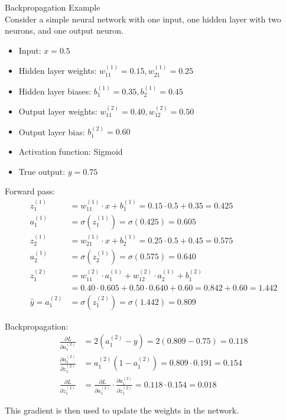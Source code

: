 \begin{example2}{Backpropagation Example}\\
Consider a simple neural network with one input, one hidden layer with two neurons, and one output neuron.
\begin{itemize}
    \item Input: $x = 0.5$
    \item Hidden layer weights: $w^{(1)}_{11} = 0.15, w^{(1)}_{21} = 0.25$
    \item Hidden layer biases: $b^{(1)}_1 = 0.35, b^{(1)}_2 = 0.45$
    \item Output layer weights: $w^{(2)}_{11} = 0.40, w^{(2)}_{12} = 0.50$
    \item Output layer bias: $b^{(2)}_1 = 0.60$
    \item Activation function: Sigmoid
    \item True output: $y = 0.75$
\end{itemize}
\tcblower
Forward pass:
\begin{align*}
z^{(1)}_1 &= w^{(1)}_{11} \cdot x + b^{(1)}_1 = 0.15 \cdot 0.5 + 0.35 = 0.425\\
a^{(1)}_1 &= \sigma(z^{(1)}_1) = \sigma(0.425) = 0.605\\
z^{(1)}_2 &= w^{(1)}_{21} \cdot x + b^{(1)}_2 = 0.25 \cdot 0.5 + 0.45 = 0.575\\
a^{(1)}_2 &= \sigma(z^{(1)}_2) = \sigma(0.575) = 0.640\\
z^{(2)}_1 &= w^{(2)}_{11} \cdot a^{(1)}_1 + w^{(2)}_{12} \cdot a^{(1)}_2 + b^{(2)}_1\\
&= 0.40 \cdot 0.605 + 0.50 \cdot 0.640 + 0.60 = 0.842 + 0.60 = 1.442\\
\hat{y} = a^{(2)}_1 &= \sigma(z^{(2)}_1) = \sigma(1.442) = 0.809
\end{align*}

Backpropagation:
\begin{align*}
\frac{\partial L}{\partial a^{(2)}_1} &= 2(a^{(2)}_1 - y) = 2(0.809 - 0.75) = 0.118\\
\frac{\partial a^{(2)}_1}{\partial z^{(2)}_1} &= a^{(2)}_1(1 - a^{(2)}_1) = 0.809 \cdot 0.191 = 0.154\\
\frac{\partial L}{\partial z^{(2)}_1} &= \frac{\partial L}{\partial a^{(2)}_1} \cdot \frac{\partial a^{(2)}_1}{\partial z^{(2)}_1} = 0.118 \cdot 0.154 = 0.018
\end{align*}

This gradient is then used to update the weights in the network.
\end{example2}

